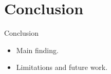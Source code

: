 \section{Conclusion}
\begin{frame}{Conclusion}
  \begin{itemize}
    \item Main finding.
    \item Limitations and future work.
  \end{itemize}
\end{frame}
